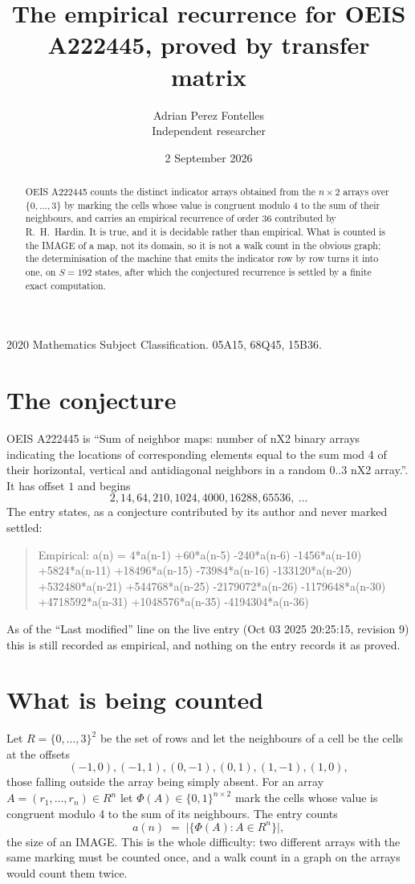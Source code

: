 \documentclass[11pt,a4paper]{article}
\title{The empirical recurrence for OEIS A222445, proved by transfer matrix}
\author{Adrian Perez Fontelles\\ \small Independent researcher}
\date{2 September 2026}
\theoremstyle{plain}
\theoremstyle{definition}
\begin{document}
\maketitle

\begin{abstract}
OEIS A222445 counts the distinct indicator arrays obtained from the $n\times2$ arrays over
$\{0,\dots,3\}$ by marking the cells whose value is congruent modulo 4 to the sum of their neighbours, and carries an
empirical recurrence of order $36$ contributed by R.~H.~Hardin. It is true, and it is
decidable rather than empirical. What is counted is the IMAGE of a map, not its domain, so it
is not a walk count in the obvious graph; the determinisation of the machine that emits the
indicator row by row turns it into one, on $S=192$ states, after which the conjectured
recurrence is settled by a finite exact computation.
\end{abstract}

\noindent\small 2020 Mathematics Subject Classification. 05A15, 68Q45, 15B36.\normalsize

\section{The conjecture}

OEIS A222445 is ``Sum of neighbor maps: number of nX2 binary arrays indicating the locations of corresponding elements equal to the sum mod 4 of their horizontal, vertical and antidiagonal neighbors in a random 0..3 nX2 array.''. It has offset $1$ and begins
\[
2, 14, 64, 210, 1024, 4000, 16288, 65536,\ \dots
\]
The entry states, as a conjecture contributed by its author and never marked settled:
\begin{quote}
Empirical: a(n) = 4*a(n-1) +60*a(n-5) -240*a(n-6) -1456*a(n-10) +5824*a(n-11) +18496*a(n-15) -73984*a(n-16) -133120*a(n-20) +532480*a(n-21) +544768*a(n-25) -2179072*a(n-26) -1179648*a(n-30) +4718592*a(n-31) +1048576*a(n-35) -4194304*a(n-36)
\end{quote}
As of the ``Last modified'' line on the live entry (Oct 03 2025 20:25:15, revision 9) this is still
recorded as empirical, and nothing on the entry records it as proved.

\section{What is being counted}

Let $R=\{0,\dots,3\}^{2}$ be the set of rows and let the neighbours of a cell be the
cells at the offsets
\[
(-1,0), (-1,1), (0,-1), (0,1), (1,-1), (1,0),
\]
those falling outside the array being simply absent. For an array
$A=(r_1,\dots,r_n)\in R^n$ let $\Phi(A)\in\{0,1\}^{n\times2}$ mark the cells whose value
is congruent modulo 4 to the sum of its neighbours. The entry counts
\[
a(n)\;=\;\bigl|\{\Phi(A):A\in R^n\}\bigr| ,
\]
the size of an IMAGE. This is the whole difficulty: two different arrays with the same marking
must be counted once, and a walk count in a graph on the arrays would count them twice.
\end{document}
